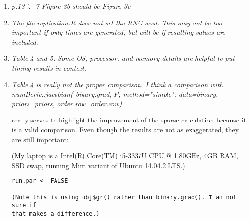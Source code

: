 \documentclass{article}
\newenvironment{revQuote}{\itshape}{\vspace{\baselineskip}}
\newenvironment{response}{\normalfont}{\vspace{\baselineskip}}
\begin{document}
\begin{enumerate}
\begin{response}
\end{response}


\item \begin{revQuote}
 p.13  l. -7  Figure 3b  should be Figure 3c
  \end{revQuote}

\begin{response}
  
\end{response}


\item \begin{revQuote}
 The file replication.R does not set the RNG seed. This may not be too
important if only times are generated, but will be if resulting values are
included.
    
  \end{revQuote}

\begin{response}
  
\end{response}


\item \begin{revQuote}
Table 4 and 5. Some OS, processor, and memory details are helpful to put
timing results in context.
  \end{revQuote}

\begin{response}
  
\end{response}


\item\begin{revQuote}
Table 4 is really not the proper comparison. I think a comparison with
       numDeriv::jacobian( binary.grad, P, method="simple", 
                   data=binary, priors=priors,
order.row=order.row)

really serves to highlight the improvement of the sparse calculation because
it is a valid comparison. Even though the results are not as exaggerated,
they are still important:

(My laptop is a  Intel(R) Core(TM) i5-3337U CPU @ 1.80GHz,  4GB RAM, SSD
swap, running Mint variant of Ubuntu 14.04.2 LTS.)

\begin{verbatim}
run.par <- FALSE

(Note this is using obj$gr() rather than binary.grad(). I am not sure if
that makes a difference.)


\end{verbatim}
\end{revQuote}
\end{enumerate}
\end{document}
